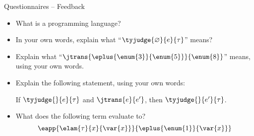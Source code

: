 \begin{frame}{Questionnaires -- Feedback}
  
  \begin{itemize}[<+->]
    \setlength\itemsep{2em}
  \item What is a programming language?
  \item In your own words, explain what
    ``$\tyjudge{\varnothing}{e}{\tau}$'' means?
  \item Explain what
    ``$\jtrans{\eplus{\enum{3}}{\enum{5}}}{\enum{8}}$'' means, using
    your own words.
  \item Explain the following statement, using your own words:

    \begin{center}
      If $\tyjudge{}{e}{\tau}$ and $\jtrans{e}{e'}$, then $\tyjudge{}{e'}{\tau}$.
    \end{center}
    
  \item What does the following term evaluate to?
    \[ 
    {\eapp{\elam{\tau}{x}{\var{x}}}{\eplus{\enum{1}}{\var{x}}}}
    \]
  \end{itemize}

\end{frame}


